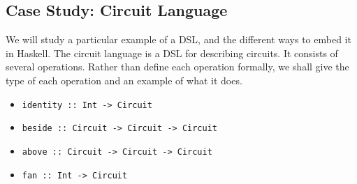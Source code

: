 \documentclass[a4paper,12pt]{article}
\theoremstyle{remark}
\begin{document}
  \subsection{Case Study: Circuit Language}

  We will study a particular example of a DSL, and the different ways to embed it
  in Haskell. The circuit language is a DSL for describing circuits. It consists of several
  operations. Rather than define each operation formally, we shall give the type of each
  operation and an example of what it does.


  \begin{itemize}
    \item \lstinline{identity :: Int -> Circuit}

    \begin{figure}[H]
      \centering
    \end{figure}

    \item \lstinline{beside :: Circuit -> Circuit -> Circuit}

    \begin{figure}[H]
      \centering
    \end{figure}

    \item \lstinline{above :: Circuit -> Circuit -> Circuit}

    \begin{figure}[H]
      \centering
    \end{figure}

    \item \lstinline{fan :: Int -> Circuit}

    \begin{figure}[H]
      \centering
    \end{figure}


\end{itemize}
\end{document}
